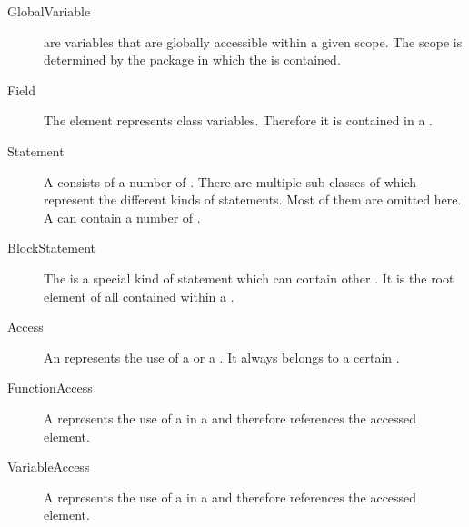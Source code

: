 \begin{description}
\item[GlobalVariable]  are variables that are globally accessible within a given scope. The scope is determined by the package in which the  is contained.
\item[Field] The  element represents class variables. Therefore it is contained in a .
\item[Statement] A  consists of a number of . There are multiple sub classes of  which represent the different kinds of statements. Most of them are omitted here. A  can contain a number of .
\item[BlockStatement] The  is a special kind of statement which can contain other . It is the root element of all  contained within a .
\item[Access] An  represents the use of a  or a . It always belongs to a certain .
\item[FunctionAccess] A  represents the use of a  in a  and therefore references the accessed  element.
\item[VariableAccess] A  represents the use of a  in a  and therefore references the accessed  element.
\end{description}
